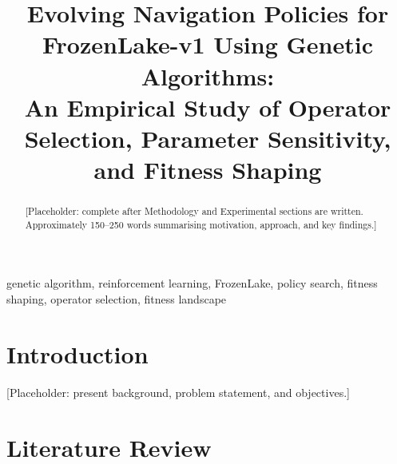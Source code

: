 \documentclass[conference]{IEEEtran}
\begin{document}
\title{Evolving Navigation Policies for FrozenLake-v1 Using Genetic Algorithms:\\
An Empirical Study of Operator Selection, Parameter Sensitivity, and Fitness Shaping}

\author{
\IEEEauthorblockN{[Author 1]}
\and
\IEEEauthorblockN{[Author 2]}
\and
\IEEEauthorblockN{[Author 3]}
}

\maketitle

\begin{abstract}
[Placeholder: complete after Methodology and Experimental sections are written.
Approximately 150--250 words summarising motivation, approach, and key findings.]
\end{abstract}

\begin{IEEEkeywords}
genetic algorithm, reinforcement learning, FrozenLake, policy search,
fitness shaping, operator selection, fitness landscape
\end{IEEEkeywords}

\section{Introduction}
[Placeholder: present background, problem statement, and objectives.]

\section{Literature Review}
\end{document}

